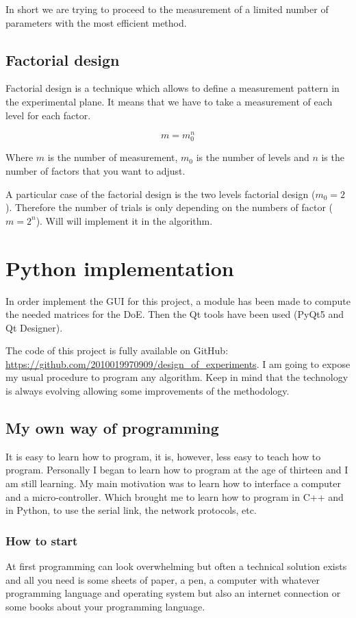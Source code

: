 \documentclass[english, 12 pt, openany, oneside]{book}
\begin{document}
In short we are trying to proceed to the measurement of a limited number of parameters with the most efficient method.

\section{Factorial design}
Factorial design is a technique which allows to define a measurement pattern in the experimental plane. It means that we have to take a measurement of each level for each factor.

\begin{equation}
m = m_0^{n}
\end{equation}

Where $m$ is the number of measurement, $m_0$ is the number of levels and $n$ is the number of factors that you want to adjust.

A particular case of the factorial design is the two levels factorial design ($m_0 = 2$). Therefore the number of trials is only depending on the numbers of factor ($m = 2^n$). Will will implement it in the algorithm.


\chapter{Python implementation}
In order implement the GUI for this project, a module has been made to compute the needed matrices for the DoE. Then the Qt tools have been used (PyQt5 and Qt Designer).

The code of this project is fully available on GitHub:\\ \url{https://github.com/2010019970909/design_of_experiments}.
I am going to expose my usual procedure to program any algorithm. Keep in mind that the technology is always evolving allowing some improvements of the methodology.

\section{My own way of programming}
It is easy to learn how to program, it is, however, less easy to teach how to program. Personally I began to learn how to program at the age of thirteen and I am still learning. My main motivation was to learn how to interface a computer and a micro-controller. Which brought me to learn how to program in C++ and in Python, to use the serial link, the network protocols, etc.

\subsection{How to start}
At first programming can look overwhelming but often a technical solution exists and all you need is some sheets of paper, a pen, a computer with whatever programming language and operating system but also an internet connection or some books about your programming language.
\end{document}
